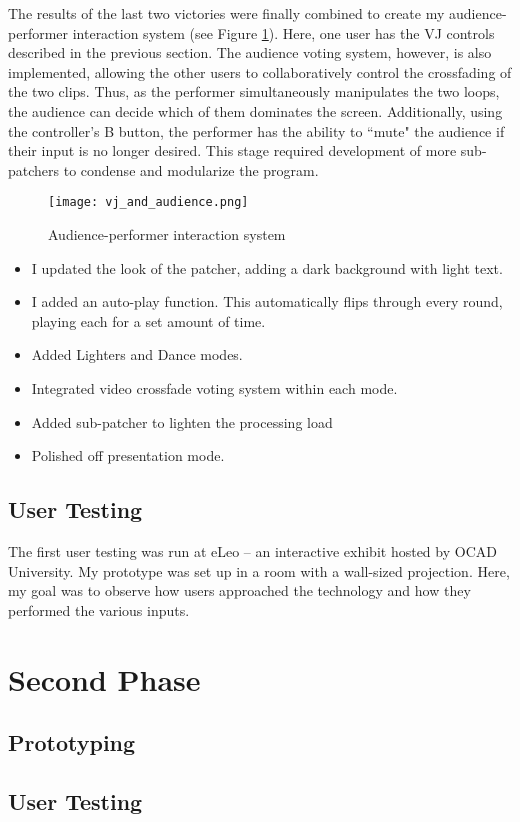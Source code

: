 The results of the last two victories were finally combined to create my audience-performer interaction system (see Figure \ref{prototyping6}). Here, one user has the VJ controls described in the previous section. The audience voting system, however, is also implemented, allowing the other users to collaboratively control the crossfading of the two clips. Thus, as the performer simultaneously manipulates the two loops, the audience can decide which of them dominates the screen. Additionally, using the controller's B button, the performer has the ability to ``mute" the audience if their input is no longer desired. This stage required development of more sub-patchers to condense and modularize the program.

\begin{figure}[t]
	\centering

	\texttt{[image: vj\_and\_audience.png]}
	\caption{Audience-performer interaction system}

	\label{prototyping6}
\end{figure}

\begin{itemize}
	\item I updated the look of the patcher, adding a dark background with light text.
	\item I added an auto-play function. This automatically flips through every round, playing each for a set amount of time.
	\item Added Lighters and Dance modes.
	\item Integrated video crossfade voting system within each mode.
	\item Added sub-patcher to lighten the processing load
	\item Polished off presentation mode.
\end{itemize}


\subsection{User Testing}

The first user testing was run at eLeo -- an interactive exhibit hosted by OCAD University. My prototype was set up in a room with a wall-sized projection. Here, my goal was to observe how users approached the technology and how they performed the various inputs.



\section{Second Phase}

\subsection{Prototyping}

\subsection{User Testing}